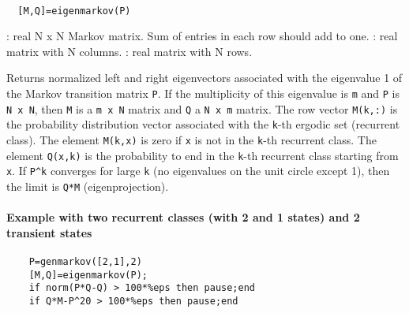 \begin{mandesc}
   \\ %
\end{mandesc}
\begin{calling_sequence}
\begin{verbatim}
  [M,Q]=eigenmarkov(P)  
\end{verbatim}
\end{calling_sequence}
\begin{parameters}
  \begin{varlist}
    : real N x N Markov matrix. Sum of entries in each row should add to one.
    : real matrix with N columns.
    : real matrix with N rows.
  \end{varlist}
\end{parameters}
\begin{mandescription}
  Returns normalized left and right eigenvectors associated with the eigenvalue
  1 of the Markov transition matrix \verb!P!.  If the multiplicity of this
  eigenvalue is \verb!m! and \verb!P!  is \verb!N x N!, then \verb!M! is a
  \verb!m x N! matrix and \verb!Q! a \verb!N x m! matrix.  The row vector
  \verb!M(k,:)! is the probability distribution vector associated with the
  \verb!k!-th ergodic set (recurrent class). The element \verb!M(k,x)! is zero
  if \verb!x! is not in the \verb!k!-th recurrent class.  The element
  \verb!Q(x,k)! is the probability to end in the \verb!k!-th recurrent class
  starting from \verb!x!. If \verb!P^k! converges for large \verb!k! (no
  eigenvalues on the unit circle except 1), then the limit is \verb!Q*M!
  (eigenprojection).
\end{mandescription}
\begin{examples}
  \paragraph{Example with two recurrent classes (with 2 and 1 states) and 2 transient states}
  \begin{Verbatim}
    P=genmarkov([2,1],2) 
    [M,Q]=eigenmarkov(P);
    if norm(P*Q-Q) > 100*%eps then pause;end
    if Q*M-P^20 > 100*%eps then pause;end
  \end{Verbatim}
\end{examples}
\begin{manseealso}
     
\end{manseealso}


